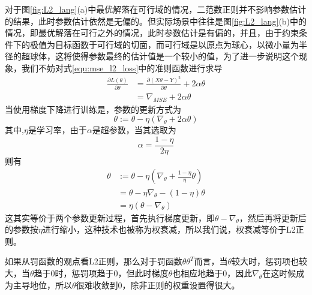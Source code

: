 对于图\ref{fig:L2_lang}(a)中最优解落在可行域的情况，二范数正则并不影响参数估计的结果，此时参数估计依然是无偏的。但实际场景中往往是图\ref{fig:L2_lang}(b)中的情况，即最优解落在可行之外的情况，此时参数估计是有偏的，并且，由于约束条件下的极值为目标函数于可行域的切面，而可行域是以原点为球心，以微小量为半径的超球体，这将使得参数最终的估计值是一个较小的值，为了进一步说明这个现象，我们不妨对式\ref{equ:mse_l2_loss}中的准则函数进行求导
\begin{equation}
\begin{split}
	\frac{\partial L(\theta)}{\partial \theta} &= \frac{\partial(X\theta  - Y)^2}{\partial \theta} + 2\alpha \theta\\
	&= \nabla_{MSE} + 2\alpha \theta
\end{split}
\end{equation}
当使用梯度下降进行训练是，参数的更新方式为
\begin{equation}
	\theta := \theta -\eta (\nabla_{\theta} + 2\alpha \theta)
\end{equation}
其中,$\eta$是学习率，由于$\alpha$是超参数，当其选取为
\begin{equation}
	\alpha = \frac{1 - \eta}{2\eta}
\end{equation}
则有
\begin{equation}
\begin{split}
	\theta &:= \theta -\eta (\nabla_{\theta} + \frac{1-\eta}{\eta} \theta)\\
	&= \theta - \eta\nabla_{\theta} - (1-\eta)\theta\\
	&=\eta(\theta - \nabla_{\theta})
 \end{split}
\end{equation}
这其实等价于两个参数更新过程，首先执行梯度更新，即$\theta - \nabla_{\theta}$，然后再将更新后的参数按$\eta$进行缩小，这种技术也被称为权衰减，所以我们说，权衰减等价于L2正则。

如果从罚函数的观点看L2正则，那么对于罚函数$\theta\theta^T$而言，当$\theta$较大时，惩罚项也较大，当$\theta$趋于0时，惩罚项趋于0，但此时梯度$\theta$也相应地趋于0，因此$\nabla_{\theta}$在这时候成为主导地位，所以$\theta$很难收敛到0，除非正则的权重设置得很大。

